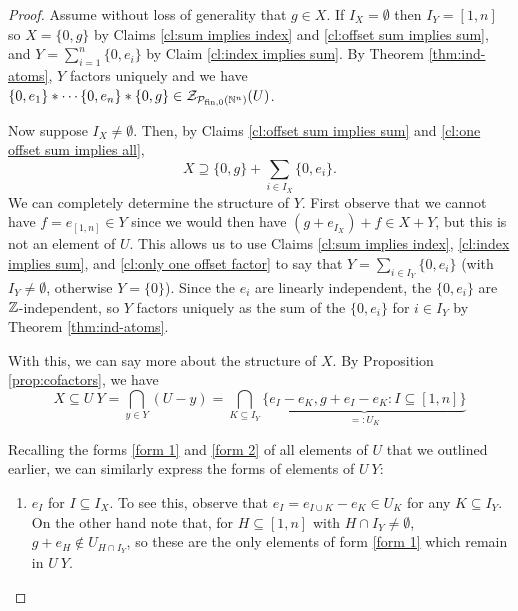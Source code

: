 \begin{proof}
	Assume without loss of generality that $g\in X$.
	If $I_X = \emptyset$ then $I_Y = [1,n]$ so $X = \{0,g\}$ by Claims \ref{cl:sum implies index} and \ref{cl:offset sum implies sum}, and $Y = \sum_{i=1}^n \{0,e_i\}$ by Claim \ref{cl:index implies sum}.
	By Theorem \ref{thm:ind-atoms}, $Y$ factors uniquely and we have $\{0,e_1\}*\cdots \{0,e_n\}*\{0,g\}\in \mathcal{Z}_{\mathcal{P}_{\textrm{fin}, 0}(\mathbb{N}^n)}(U)$.
	
	Now suppose $I_X \neq \emptyset$.
	Then, by Claims \ref{cl:offset sum implies sum} and \ref{cl:one offset sum implies all}, 
	\[X \supseteq \{0,g\} + \sum_{i\in I_X} \{0,e_i\}. \tag{1} \label{factor-includes} \]
	We can completely determine the structure of $Y$.
	First observe that we cannot have $f=e_{[1,n]}\in Y$ since we would then have $(g+e_{I_X})+f \in X+Y$, but this is not an element of $U$.
	This allows us to use Claims \ref{cl:sum implies index}, \ref{cl:index implies sum}, and \ref{cl:only one offset factor} to say that $Y = \sum_{i\in I_Y} \{0,e_i\}$ (with $I_Y\neq\emptyset$, otherwise $Y=\{0\}$).
	Since the $e_i$ are linearly independent, the $\{0,e_i\}$ are $\mathbb{Z}$-independent, so $Y$ factors uniquely as the sum of the $\{0,e_i\}$ for $i\in I_Y$ by Theorem \ref{thm:ind-atoms}.
	
	With this, we can say more about the structure of $X$.
	By Proposition \ref{prop:cofactors}, we have 
	\[X \subseteq U\:Y = \bigcap_{y\in Y}(U-y) = \bigcap_{K\subseteq I_Y} \underbrace{\{e_I - e_K, g+e_I - e_K : I\subseteq [ 1,n ] \}}_{=:U_K} \tag{2} \label{Y cofactor}\]
	
	Recalling the forms \ref{form 1} and \ref{form 2} of all elements of $U$ that we outlined earlier, we can similarly express the forms of elements of $U\:Y$:
	\begin{enumerate}[label={\rm ({\small F\arabic{*}}$'$)}]
		\item $e_I$ for $I\subseteq I_X$. \label{form 1'}
		To see this, observe that $e_I = e_{I\cup K}-e_K\in U_K$ for any $K\subseteq I_Y$.
		On the other hand note that, for $H \subseteq [ 1,n ]$ with $H\cap I_Y\neq \emptyset$, $g+e_H\notin U_{H\cap I_Y}$, so these are the only elements of form \ref{form 1} which remain in $U\:Y$.


\end{enumerate}
\end{proof}
